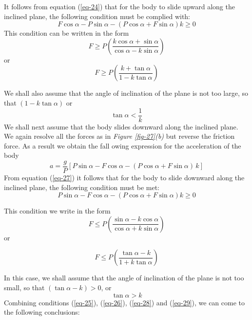 \documentclass[a4paper,sfsidenotes]{tufte-book}
\begin{document}
It follows from equation (\ref{eq-24}) that for the body to slide upward along the inclined plane, the following condition must be complied with:
$$
F \cos \alpha - P \sin \alpha -\left( P \cos \alpha + F \sin \alpha \right) k \geqslant 0
$$
This condition can be written in the form
$$
F \geqslant P \left ( \frac{k \cos \alpha + \sin \alpha}{\cos \alpha -k \sin \alpha} \right)
$$
or
\begin{equation}
F \geqslant P \left ( \frac{k + \tan \alpha}{ 1 -k \tan \alpha} \right)
\label{eq-25}
\end{equation}

We shall also assume that the angle of inclination of the plane is not too large, so that $(1-k \tan \alpha)$ or 
\begin{equation}
\tan \alpha < \frac{1}{k}
\label{eq-26}
\end{equation}
We shall next assume that the body slides downward along the inclined plane. We again resolve all the forces as in \emph{Figure \ref{fig-27}(b)} but reverse the friction force. As a result we obtain the fall owing expression for the acceleration of the body 
\begin{equation}
a= \frac{g}{P} \left[P \sin \alpha -F \cos \alpha - \left( P \cos \alpha + F \sin \alpha \right) \, k \right]
\label{eq-27}
\end{equation}
From equation (\ref{eq-27}) it follows that for the body to slide downward along the inclined plane, the following condition must be met:
$$
P \sin \alpha -F \cos \alpha - \left( P \cos \alpha + F \sin \alpha \right) k \geqslant 0
$$

This condition we write in the form
\begin{equation*}
F \leqslant P \left ( \frac{ \sin \alpha - k \cos \alpha}{\cos \alpha + k \sin \alpha} \right)
\end{equation*}
or

\begin{equation}
F \leqslant P \left ( \frac{ \tan \alpha -k }{ 1 + k \tan \alpha} \right)
\label{eq-28}
\end{equation}

In this case, we shall assume that the angle of inclination of the plane is not too small, so that $(\tan \alpha- k)>0$, or
\begin{equation}
\tan \alpha > k
\label{eq-29}
\end{equation}
Combining conditions (\ref{eq-25}), (\ref{eq-26}), (\ref{eq-28}) and (\ref{eq-29}), we can come to
the following conclusions:
\end{document}
